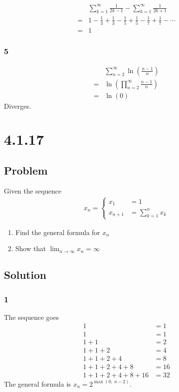 \documentclass[12pt]{article}
\newcommand{\round}[1]{\left(       #1 \right)      }
\begin{document}
\begin{align*}
     & \sum_{k=1}^\infty \frac{1}{2k-1} - \sum_{k=1}^\infty \frac{1}{2k+1} \\
    =& 1 - \frac{1}{3} + \frac{1}{3} - \frac{1}{5} + \frac{1}{5} - \frac{1}{7} + \frac{1}{7} - \cdots \\
    =& 1
\end{align*}

\subsubsection*{5}
\begin{align*}
     & \sum_{n=2}^\infty \ln\round{\frac{n-1}{n}} \\
    =& \ln\round{\prod_{n=2}^\infty \frac{n-1}{n}} \\
    =& \ln(0)
\end{align*}
Diverges.



\section*{4.1.17}

\subsection*{Problem}
Given the sequence
\begin{align*}
    x_n = \begin{cases}
        x_1 &= 1 \\
        x_{n + 1} &= \sum_{k = 1}^n x_k
    \end{cases}
\end{align*}
\begin{enumerate}
    \item Find the general formula for $x_n$
    \item Show that $\lim_{n \to \infty} x_n = \infty$
\end{enumerate}

\subsection*{Solution}

\subsubsection*{1}
The sequence goes
\begin{align*}
    1 &= 1             \\
    1 &= 1             \\
    1+1 &= 2           \\
    1+1+2 &= 4         \\
    1+1+2+4 &= 8       \\
    1+1+2+4+8 &= 16    \\
    1+1+2+4+8+16 &= 32
\end{align*}
The general formula is $x_n = 2^{\max(0,\ n-2)}$.
\end{document}
